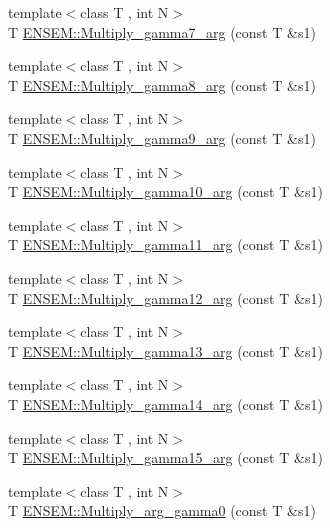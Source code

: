 \begin{DoxyCompactItemize}
{\footnotesize template$<$class T , int N$>$ }\\T \mbox{\hyperlink{namespaceENSEM_afef63b4334aa17ecf19ae4b2022d735f}{E\+N\+S\+E\+M\+::\+Multiply\+\_\+gamma7\+\_\+arg}} (const T \&s1)
\item 
{\footnotesize template$<$class T , int N$>$ }\\T \mbox{\hyperlink{namespaceENSEM_acafd9841429af6b6b6f2021fb85011f2}{E\+N\+S\+E\+M\+::\+Multiply\+\_\+gamma8\+\_\+arg}} (const T \&s1)
\item 
{\footnotesize template$<$class T , int N$>$ }\\T \mbox{\hyperlink{namespaceENSEM_a9549bbaa92e4e60d143426d3a4cfe161}{E\+N\+S\+E\+M\+::\+Multiply\+\_\+gamma9\+\_\+arg}} (const T \&s1)
\item 
{\footnotesize template$<$class T , int N$>$ }\\T \mbox{\hyperlink{namespaceENSEM_a42393303080da191decc1e01988b62db}{E\+N\+S\+E\+M\+::\+Multiply\+\_\+gamma10\+\_\+arg}} (const T \&s1)
\item 
{\footnotesize template$<$class T , int N$>$ }\\T \mbox{\hyperlink{namespaceENSEM_af5e60b5893c30408a3b7d3da5b7c5f6e}{E\+N\+S\+E\+M\+::\+Multiply\+\_\+gamma11\+\_\+arg}} (const T \&s1)
\item 
{\footnotesize template$<$class T , int N$>$ }\\T \mbox{\hyperlink{namespaceENSEM_abe630fefe9bf4d743519870f8da7cd57}{E\+N\+S\+E\+M\+::\+Multiply\+\_\+gamma12\+\_\+arg}} (const T \&s1)
\item 
{\footnotesize template$<$class T , int N$>$ }\\T \mbox{\hyperlink{namespaceENSEM_ada6a9330c7a86fb18f76313b549d202c}{E\+N\+S\+E\+M\+::\+Multiply\+\_\+gamma13\+\_\+arg}} (const T \&s1)
\item 
{\footnotesize template$<$class T , int N$>$ }\\T \mbox{\hyperlink{namespaceENSEM_a51519aac850a9e91ae4b8290df023859}{E\+N\+S\+E\+M\+::\+Multiply\+\_\+gamma14\+\_\+arg}} (const T \&s1)
\item 
{\footnotesize template$<$class T , int N$>$ }\\T \mbox{\hyperlink{namespaceENSEM_ad162069adba3b41fb86d8ff508380d57}{E\+N\+S\+E\+M\+::\+Multiply\+\_\+gamma15\+\_\+arg}} (const T \&s1)
\item 
{\footnotesize template$<$class T , int N$>$ }\\T \mbox{\hyperlink{namespaceENSEM_ae70068bb9b31b907021cb38c9353131f}{E\+N\+S\+E\+M\+::\+Multiply\+\_\+arg\+\_\+gamma0}} (const T \&s1)

\end{DoxyCompactItemize}

